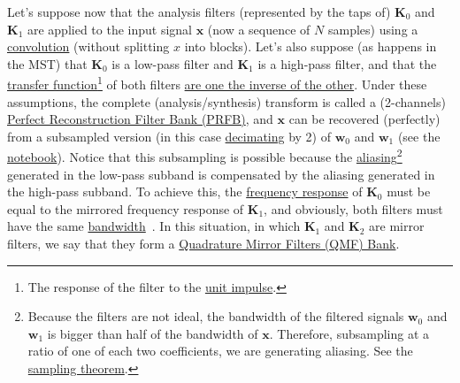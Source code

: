 Let's suppose now that the analysis filters (represented by the taps
of) ${\mathbf K}_0$ and ${\mathbf K}_1$ are applied to the input
signal ${\mathbf x}$ (now a sequence of $N$ samples) using a
\href{https://en.wikipedia.org/wiki/Kernel_(image_processing)}{convolution}
(without splitting $x$ into blocks). Let's also suppose (as happens in
the MST) that ${\mathbf K}_0$ is a low-pass filter and ${\mathbf K}_1$
is a high-pass filter, and that the
\href{https://en.wikipedia.org/wiki/Filter_(signal_processing)#The_transfer_function}{transfer
  function}\footnote{The response of the filter to the
\href{https://en.wikipedia.org/?title=Unit_impulse&redirect=no}{unit
  impulse}.} of both filters
\href{https://en.wikipedia.org/wiki/Filter_bank#Perfect_reconstruction_filter_banks}{are
  one the inverse of the other}. Under these assumptions, the complete
(analysis/synthesis) transform is called a (2-channels)
\href{https://en.wikipedia.org/wiki/Filter_bank#Perfect_reconstruction_filter_banks}{Perfect
  Reconstruction Filter Bank (PRFB)}, and ${\mathbf x}$ can be
recovered (perfectly) from a subsampled version (in this case
\href{https://en.wikipedia.org/wiki/Downsampling_(signal_processing)}{decimating}
by 2) of ${\mathbf w}_0$ and ${\mathbf w}_1$ (see the
\href{https://github.com/Tecnologias-multimedia/intercom/blob/master/docs/PRFB.ipynb}{notebook}). Notice
that this subsampling is possible because the
\href{https://en.wikipedia.org/wiki/Aliasing}{aliasing}\footnote{Because
the filters are not ideal, the bandwidth of the filtered signals
${\mathbf w}_0$ and ${\mathbf w}_1$ is bigger than half of the
bandwidth of ${\mathbf x}$. Therefore, subsampling at a ratio of one
of each two coefficients, we are generating aliasing. See the
\href{https://en.wikipedia.org/wiki/Nyquist-Shannon_sampling_theorem}{sampling
  theorem}.}  generated in the low-pass subband is compensated by the
aliasing generated in the high-pass subband. To achieve this, the
\href{https://en.wikipedia.org/wiki/Filter_(signal_processing)#The_transfer_function}{frequency
  response} of ${\mathbf K}_0$ must be equal to the mirrored frequency
response of ${\mathbf K}_1$, and obviously, both filters must have the
same
\href{https://en.wikipedia.org/wiki/Bandwidth_(signal_processing)}{bandwidth}~\cite{sayood2017introduction}. In
this situation, in which ${\mathbf K}_1$ and ${\mathbf K}_2$ are
mirror filters, we say that they form a
\href{https://en.wikipedia.org/wiki/Quadrature_mirror_filter}{Quadrature
  Mirror Filters (QMF) Bank}.


